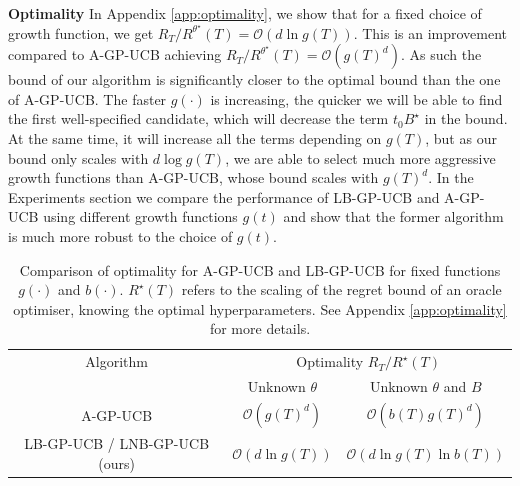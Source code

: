 \documentclass{article}
\theoremstyle{plain}
\theoremstyle{definition}
\theoremstyle{remark}
\theoremstyle{plain}
\begin{document}
\textbf{Optimality} In Appendix \ref{app:optimality}, we show that for a fixed choice of growth function, we get $R_T / R^{\theta^\star}(T) = \mathcal{O}(d\ln g(T))$. This is an improvement compared to A-GP-UCB achieving $R_T / R^{\theta^\star}(T) = \mathcal{O}(g(T)^{d})$. As such the bound of our algorithm is significantly closer to the optimal bound than the one of A-GP-UCB.  The faster $g(\cdot)$ is increasing, the quicker we will be able to find the first well-specified candidate, which will decrease the term $t_0 B^\star$ in the bound. At the same time, it will increase all the terms depending on $g(T)$, but as our bound only scales with $d \log g(T)$, we are able to select much more aggressive growth functions than A-GP-UCB, whose bound scales with $g(T)^{d}$. In the Experiments section we compare the performance of LB-GP-UCB and A-GP-UCB using different growth functions $g(t)$ and show that the former algorithm is much more robust to the choice of $g(t)$.

\begin{table}[t]
    
    \caption{Comparison of optimality for A-GP-UCB and LB-GP-UCB for fixed functions $g(\cdot)$ and $b(\cdot)$. $R^\star (T)$ refers to the scaling of the regret bound of an oracle optimiser, knowing the optimal hyperparameters. See Appendix \ref{app:optimality} for more details.}

    
    \centering

    
    \begin{tabular}{ccc}
    \toprule
    Algorithm   & \multicolumn{2}{c}{Optimality $R_T / R^\star(T)$ }\\
    & Unknown $\theta$ & Unknown $\theta$ and $B$ \\
    \midrule
      
      A-GP-UCB \cite{berkenkamp2019no}   &  $\mathcal{O}(g(T)^{d})$ & $\mathcal{O}(b(T)g(T)^{d})$ \\ 
      
      LB-GP-UCB / LNB-GP-UCB (ours)   &  $\mathcal{O}({d} \ln g(T))$ & $\mathcal{O}({d} \ln g(T) \ln b(T)) $ \\
      \bottomrule
    \end{tabular}
    
    \label{tab:regretcomp}
\end{table}
\end{document}
